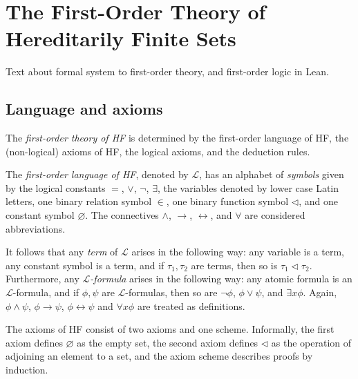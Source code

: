 \chapter{The First-Order Theory of Hereditarily Finite Sets}

Text about formal system to first-order theory, and first-order logic in Lean.

\section{Language and axioms}

The \textit{first-order theory of HF} is determined by the first-order language of HF, 
the (non-logical) axioms of HF, the logical axioms, and the deduction rules.

\begin{definition}
    \label{def:Lang}
    \leanok
    The \textit{first-order language of HF}, denoted by $\mathcal{L}$, 
    has an alphabet of \textit{symbols} given by the 
    logical constants $=$, $\lor$, $\neg$, $\exists$, the variables denoted by 
    lower case Latin letters, one binary relation symbol $\in$, one binary function symbol $\lhd$, 
    and one constant symbol $\varnothing$.
    The connectives $\land$, $\rightarrow$, $\leftrightarrow$, and $\forall$ are considered 
    abbreviations.
\end{definition}

It follows that any \textit{term} of $\mathcal{L}$ arises in the following way:
any variable is a term, any constant symbol is a term, and if $\tau_1, \tau_2$ are terms, then so is
$\tau_1 \lhd \tau_2$.
Furthermore, any \textit{$\mathcal{L}$-formula} arises in the following way:
any atomic formula is an $\mathcal{L}$-formula, and if $\phi, \psi$ are $\mathcal{L}$-formulas, 
then so are $\neg \phi$, $\phi \lor \psi$, and $\exists x \phi$.
Again, $\phi \land \psi$, $\phi \rightarrow \psi$, $\phi \leftrightarrow \psi$ and
$\forall x \phi$ are treated as definitions.

The axioms of HF consist of two axioms and one scheme. 
Informally, the first axiom defines $\varnothing$ as the
empty set, the second axiom defines $\lhd$ as the operation of adjoining an element to a set,
and the axiom scheme describes proofs by induction.

